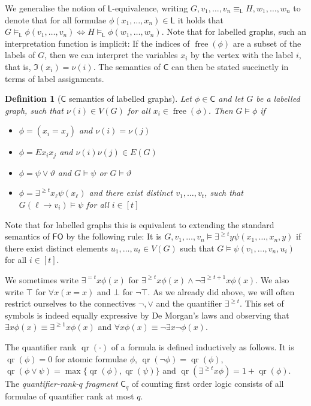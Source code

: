 \documentclass[10pt,a4paper]{article}
\newtheorem{definition}[theorem]{Definition}
\renewcommand{\theta}{\vartheta}
\newcommand{\I}{\ensuremath{\mathfrak I}}
\newcommand{\lFO}{\ensuremath{\mathsf{FO}}}
\newcommand{\lC} {\ensuremath{\mathsf C}}
\newcommand{\lL} {\ensuremath{\mathsf L}}
\DeclareMathOperator{\qr}{qr}
\DeclareMathOperator{\free}{free}
\begin{document}
We generalise the notion of $\lL$-equivalence, writing $G, v_1, \dots, v_n \equiv_\lL H, w_1, \dots, w_n$ to denote that for all formulae $\phi(x_1, \dots, x_n) \in \lL$ it holds that $G \models_\lL \phi(v_1, \dots, v_n) \Leftrightarrow H \models_\lL \phi(w_1, \dots, w_n)$. Note that for labelled graphs, such an interpretation function is implicit: If the indices of $\free(\phi)$ are a subset of the labels of $G$, then we can interpret the variables $x_i$ by the vertex with the label $i$, that is, $\I(x_i) = \nu(i)$. The semantics of $\lC$ can then be stated succinctly in terms of label assignments.

\begin{definition}[$\lC$ semantics of labelled graphs]
  Let $\phi \in \lC$ and let $G$ be a labelled graph, such that $\nu(i) \in V(G)$ for all $x_i \in \free(\phi)$. Then $G \models \phi$ if
  \begin{itemize}
  \item $\phi = (x_i = x_j)$ and $\nu(i) = \nu(j)$
  \item $\phi = Ex_ix_j$ and $\nu(i)\nu(j) \in E(G)$
  \item $\phi = \psi \lor \theta$ and $G \models \psi$ or $G \models \theta$
  \item $\phi = \exists^{\geq t} x_\ell \psi(x_\ell)$ and there exist distinct $v_1, \dots, v_t$, such that $G(\ell \to v_i) \models \psi$ for all $i \in [t]$
  \end{itemize}
\end{definition}

Note that for labelled graphs this is equivalent to extending the standard semantics of $\lFO$ by the following rule: It is $G, v_1, \dots, v_n \models \exists^{\geq t}y \psi(x_1, \dots, x_n, y)$ if there exist distinct elements $u_1, \dots, u_t \in V(G)$ such that $G \models \psi(v_1, \dots, v_n, u_i)$ for all $i \in [t]$.

We sometimes write $\exists^{=t}x \phi(x)$ for $\exists^{\geq t} x \phi(x) \land \neg\exists^{\geq t+1}x \phi(x)$. We also write $\top$ for $\forall x (x=x)$ and $\bot$ for $\neg \top$.
As we already did above, we will often restrict ourselves to the connectives $\neg, \lor$ and the quantifier $\exists^{\geq t}$. This set of symbols is indeed equally expressive by De Morgan's laws and observing that $\exists x \phi(x) \equiv \exists^{\geq 1}x \phi(x)$ and $\forall x \phi(x) \equiv \neg\exists x \neg\phi(x)$.

The quantifier rank $\qr(\cdot)$ of a formula is defined inductively as follows. It is $\qr(\phi) = 0$ for atomic formulae $\phi$, $\qr(\neg\phi) = \qr(\phi)$, $\qr(\phi \lor \psi) = \max \{ \qr(\phi), \qr(\psi)\}$ and $\qr(\exists^{\geq t}x \phi) = 1 + \qr(\phi)$. The \emph{quantifier-rank-$q$ fragment} $\lC_q$ of counting first order logic consists of all formulae of quantifier rank at most $q$.
\end{document}
